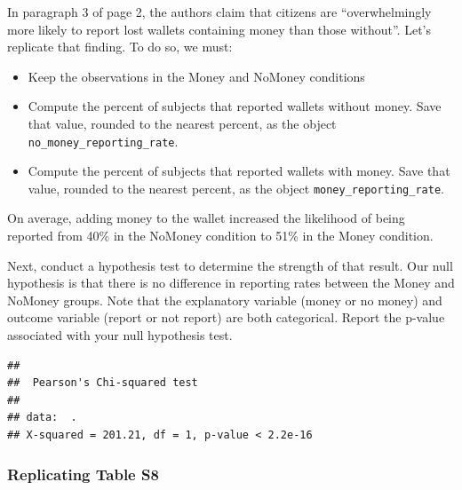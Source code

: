\documentclass[12pt,halfline,a4paper,]{ouparticle}
\newenvironment{Shaded}{\begin{snugshade}}{\end{snugshade}}
\newcommand{\DataTypeTok}[1]{\textcolor[rgb]{0.13,0.29,0.53}{#1}}
\newcommand{\DecValTok}[1]{\textcolor[rgb]{0.00,0.00,0.81}{#1}}
\newcommand{\KeywordTok}[1]{\textcolor[rgb]{0.13,0.29,0.53}{\textbf{#1}}}
\newcommand{\NormalTok}[1]{#1}
\newcommand{\OperatorTok}[1]{\textcolor[rgb]{0.81,0.36,0.00}{\textbf{#1}}}
\newcommand{\OtherTok}[1]{\textcolor[rgb]{0.56,0.35,0.01}{#1}}
\newcommand{\StringTok}[1]{\textcolor[rgb]{0.31,0.60,0.02}{#1}}
\providecommand{\tightlist}{%
  \setlength{\itemsep}{0pt}\setlength{\parskip}{0pt}}
\begin{document}
In paragraph 3 of page 2, the authors claim that citizens are
``overwhelmingly more likely to report lost wallets containing money
than those without''. Let's replicate that finding. To do so, we must:

\begin{itemize}
\tightlist
\item
  Keep the observations in the Money and NoMoney conditions
\item
  Compute the percent of subjects that reported wallets without money.
  Save that value, rounded to the nearest percent, as the object
  \texttt{no\_money\_reporting\_rate}.
\item
  Compute the percent of subjects that reported wallets with money. Save
  that value, rounded to the nearest percent, as the object
  \texttt{money\_reporting\_rate}.
\end{itemize}

On average, adding money to the wallet increased the likelihood of being
reported from 40\% in the NoMoney condition to 51\% in the Money
condition.

Next, conduct a hypothesis test to determine the strength of that
result. Our null hypothesis is that there is no difference in reporting
rates between the Money and NoMoney groups. Note that the explanatory
variable (money or no money) and outcome variable (report or not report)
are both categorical. Report the p-value associated with your null
hypothesis test.

\begin{Shaded}
\end{Shaded}

\begin{verbatim}
## 
##  Pearson's Chi-squared test
## 
## data:  .
## X-squared = 201.21, df = 1, p-value < 2.2e-16
\end{verbatim}

\hypertarget{replicating-table-s8}{%
\subsubsection{Replicating Table S8}\label{replicating-table-s8}}
\end{document}
